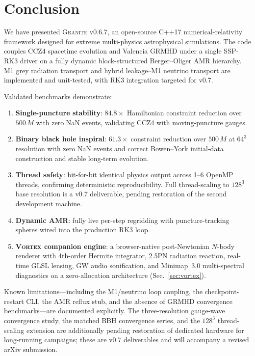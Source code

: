 \documentclass[aps,prd,twocolumn,superscriptaddress,nofootinbib,showpacs,
               longbibliography]{revtex4-2}
\newcommand{\granite}{\textsc{Granite}}
\begin{document}
\section{Conclusion}
\label{sec:conclusion}

We have presented \granite{} v0.6.7, an open-source C++17 numerical-relativity
framework designed for extreme multi-physics astrophysical simulations.
The code couples CCZ4 spacetime evolution and Valencia GRMHD under a single
SSP-RK3 driver on a fully dynamic block-structured Berger--Oliger AMR
hierarchy.
M1 grey radiation transport and hybrid leakage--M1 neutrino transport are
implemented and unit-tested, with RK3 integration targeted for v0.7.

Validated benchmarks demonstrate:
\begin{enumerate}[nosep]
  \item \textbf{Single-puncture stability}: $84.8\times$ Hamiltonian
    constraint reduction over $500\,M$ with zero NaN events, validating CCZ4
    with moving-puncture gauges.
  \item \textbf{Binary black hole inspiral}: $61.3\times$ constraint reduction
    over $500\,M$ at $64^3$ resolution with zero NaN events and correct
    Bowen--York initial-data construction and stable long-term evolution.
  \item \textbf{Thread safety}: bit-for-bit identical physics output across
    1--6 OpenMP threads, confirming deterministic reproducibility.
    Full thread-scaling to $128^3$ base resolution is a v0.7 deliverable,
    pending restoration of the second development machine.
  \item \textbf{Dynamic AMR}: fully live per-step regridding with
    puncture-tracking spheres wired into the production RK3 loop.
  \item \textbf{\textsc{Vortex} companion engine}: a browser-native
    post-Newtonian $N$-body renderer with 4th-order Hermite integrator,
    2.5PN radiation reaction, real-time GLSL lensing, GW audio sonification,
    and Minimap~3.0 multi-spectral diagnostics on a zero-allocation
    architecture (Sec.~\ref{sec:vortex}).
\end{enumerate}

Known limitations---including the M1/neutrino loop coupling, the
checkpoint-restart CLI, the AMR reflux stub, and the absence of
GRMHD convergence benchmarks---are documented explicitly.
The three-resolution gauge-wave convergence study, the matched BBH
convergence series, and the $128^3$ thread-scaling extension are
additionally pending restoration of dedicated hardware for long-running
campaigns; these are v0.7 deliverables and will accompany a revised
arXiv submission.
\end{document}
